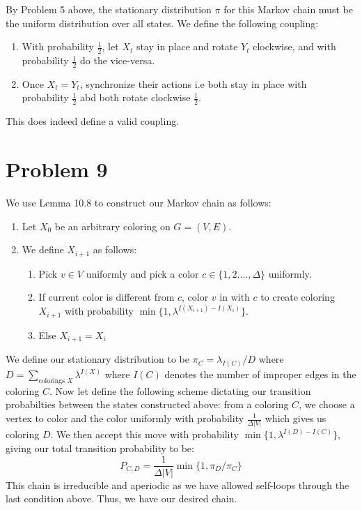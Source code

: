 \documentclass[12pt]{article}%
\begin{document}
By Problem 5 above, the stationary distribution $\pi$ for this Markov chain must be the uniform distribution over all states.
We define the following coupling:
\begin{enumerate}
  \item With probability $\frac{1}{2}$, let $X_t$ stay in place and rotate $Y_t$ clockwise, and with probability $\frac{1}{2}$ do the vice-versa.
  \item Once $X_t = Y_t$, synchronize their actions i.e both stay in place with probability $\frac{1}{2}$ abd both rotate clockwise $\frac{1}{2}$.
\end{enumerate}
 This does indeed define a valid coupling.


\section*{Problem 9}
We use Lemma 10.8 to construct our Markov chain as follows:
\begin{enumerate}
  \item Let $X_0$ be an arbitrary coloring on $G = (V,E)$.
  \item We define $X_{i+1}$ as follows:
  \begin{enumerate}
    \item Pick $v \in V$ uniformly and pick a color $c \in\{1,2....,\Delta\}$ uniformly.
    \item If current color is different from $c$, color $v$ in with $c$ to create coloring $X_{i+1}$ with probability $\min\{1,\lambda^{I(X_{i+1}) - I(X_i)} \}$.
    \item Else $X_{i+1} = X_i$
  \end{enumerate}
\end{enumerate}

We define our stationary distribution to be $\pi_C = \lambda_{I(C)}/D$ where $D = \sum_{\text{colorings } X} \lambda^{I(X)}$ where $I(C)$ denotes the number of improper edges in the coloring $C$. Now let define the following scheme dictating our transition probabilties between the states constructed above: from a coloring $C$, we choose a vertex to color and the color uniformly with probability $\frac{1}{\Delta |V|}$ which gives us coloring $D$. We then accept this move with probability $\min\{1,\lambda^{I(D) - I(C)}\}$, giving our total transition probability to be:
$$ P_{C,D} = \frac{1}{\Delta |V|} \min\{1,\pi_D / \pi_C\}$$
This chain is irreducible and aperiodic as we have allowed self-loops through the last condition above. Thus, we have our desired chain.
\end{document}
